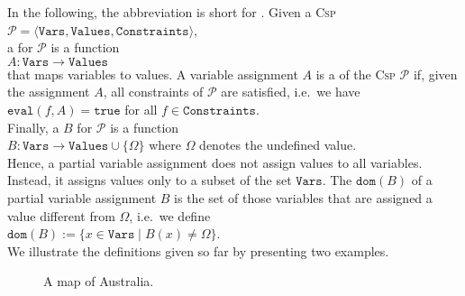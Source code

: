 In the following, the abbreviation  is short for .
Given a \textsc{Csp}
\\[0.2cm]
\hspace*{1.3cm}
 $\mathcal{P} = \langle \texttt{Vars}, \texttt{Values}, \texttt{Constraints} \rangle$, 
\\[0.2cm]
a  for $\mathcal{P}$ is a function 
\\[0.2cm]
\hspace*{1.3cm}
$A: \texttt{Vars} \rightarrow \texttt{Values}$
\\[0.2cm]
that maps variables to values.  A variable assignment $A$ is a  
of the \textsc{Csp} $\mathcal{P}$  
if, given the assignment $A$, all constraints of $\mathcal{P}$ are satisfied, i.e.~we have
\\[0.2cm]
\hspace*{1.3cm}
$\texttt{eval}(f, A) = \texttt{true}$ \quad for all $f \in \texttt{Constraints}$.
\\[0.2cm]
Finally, a  $B$ for $\mathcal{P}$ is a function 
\\[0.2cm]
\hspace*{1.3cm}
$B: \texttt{Vars} \rightarrow \texttt{Values} \cup \{ \Omega \}$ \quad where $\Omega$ denotes the undefined value.
\\[0.2cm]
Hence, a partial variable assignment does not assign values to all variables.  Instead, it assigns values only
to a subset of the set $\texttt{Vars}$.  The  $\texttt{dom}(B)$ of a partial variable assignment $B$ is the
set of those variables that are assigned a value different from $\Omega$, i.e.~we define
\\[0.2cm]
\hspace*{1.3cm}
$\texttt{dom}(B) := \bigl\{ x \in \texttt{Vars} \mid B(x) \not= \Omega \bigr\}$.
\\[0.2cm]
We illustrate the definitions given so far by presenting two examples.


\begin{figure}[!ht]
  \centering
  \caption{A map of Australia.}
  \label{fig:australia.pdf}
\end{figure}

